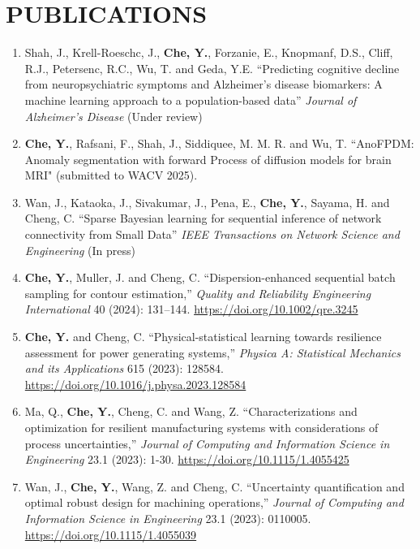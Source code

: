 \documentclass[10pt]{article}
\begin{document}
\section*{PUBLICATIONS}
\begin{enumerate}
	\item Shah, J., Krell-Roeschc, J., {\bf Che, Y.}, Forzanie, E., Knopmanf, D.S., Cliff, R.J., Petersenc, R.C., Wu, T. and Geda, Y.E. ``Predicting cognitive decline from neuropsychiatric symptoms and Alzheimer’s disease biomarkers: A machine learning approach to a population-based data'' \textit{Journal of Alzheimer's Disease} (Under review)
	
	\item {\bf Che, Y.}, Rafsani, F., Shah, J., Siddiquee, M. M. R. and Wu, T. ``AnoFPDM: Anomaly segmentation with forward Process of diffusion models for brain MRI" (submitted to WACV 2025). 

	\item Wan, J., Kataoka, J., Sivakumar, J., Pena, E., {\bf Che, Y.}, Sayama, H. and Cheng, C. ``Sparse Bayesian learning for sequential inference of network connectivity from Small Data'' \textit{IEEE Transactions on Network Science and Engineering} (In press)
	
	\item {\bf Che, Y.}, Muller, J. and Cheng, C. ``Dispersion-enhanced sequential batch sampling for contour estimation,'' \textit{Quality and Reliability Engineering International} 40 (2024): 131–144. \url{https://doi.org/10.1002/qre.3245} 

	\item {\bf Che, Y.} and Cheng, C. ``Physical-statistical learning towards resilience assessment for power generating systems,'' \textit{Physica A: Statistical Mechanics and its Applications} 615 (2023): 128584. \url{https://doi.org/10.1016/j.physa.2023.128584}

	\item Ma, Q., {\bf Che, Y.}, Cheng, C. and Wang, Z. ``Characterizations and optimization for resilient manufacturing systems with considerations of process uncertainties,'' \textit{Journal of Computing and Information Science in Engineering} 23.1 (2023): 1-30. \url{ https://doi.org/10.1115/1.4055425}

	\item Wan, J., {\bf Che, Y.}, Wang, Z. and Cheng, C. ``Uncertainty quantification and optimal robust design for machining operations,'' \textit{Journal of Computing and Information Science in Engineering} 23.1 (2023): 0110005. \url{https://doi.org/10.1115/1.4055039}


\end{enumerate}
\end{document}
